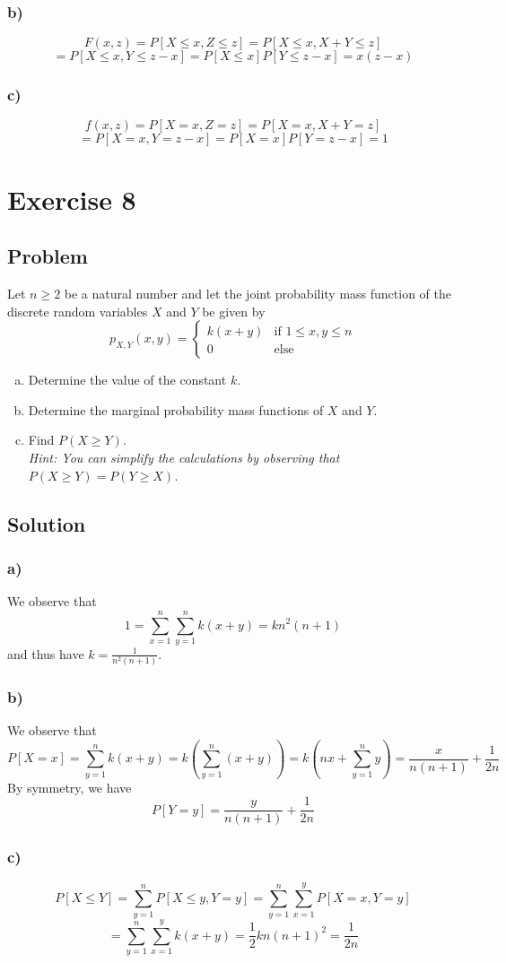 \documentclass[a4paper,10pt]{article}
\begin{document}
\subsubsection{b)}
$$
  F(x, z) = P[X \leq x, Z \leq z] = P[X \leq x, X + Y \leq z]
$$
$$
  = P[X \leq x, Y \leq z - x] = P[X \leq x]P[Y \leq z - x] = x (z - x)
$$

\subsubsection{c)}
$$
  f(x, z) = P[X = x, Z = z] = P[X = x, X + Y = z]
$$
$$
   = P[X = x, Y = z - x] = P[X = x]P[Y = z - x] = 1
$$

\section{Exercise 8}
\subsection{Problem}

Let $n \geq 2$ be a natural number and let the joint probability mass function of the discrete random variables $X$ and $Y$ be given by
$$
  p_{X,Y}(x, y) = \begin{cases}
    k (x + y) & \mbox{if }1 \leq x,y \leq n \\
    0 & \mbox{else}
  \end{cases}
$$

\begin{enumerate}[a)]
  \item Determine the value of the constant $k$.
  \item Determine the marginal probability mass functions of $X$ and $Y$.
  \item Find $P(X \geq Y)$. \\
  \textit{Hint: You can simplify the calculations by observing that $P(X \geq Y) = P(Y \geq X)$. }
\end{enumerate}

\subsection{Solution}
\subsubsection{a)}
We observe that $$
  1 = \sum_{x = 1}^{n}{\sum_{y = 1}^{n}{k (x + y)}} = k n^2 (n + 1)
$$ and thus have $k = \frac{1}{n^2 (n + 1)}$.
\subsubsection{b)}
We observe that $$
  P[X = x] = \sum_{y = 1}^{n}{k (x + y)} = k (\sum_{y = 1}^{n}{(x + y)})
  = k (nx + \sum_{y = 1}^{n}{y})
  = \frac{x}{n (n + 1)} + \frac{1}{2 n}
$$ By symmetry, we have
$$
  P[Y = y] = \frac{y}{n (n + 1)} + \frac{1}{2 n}
$$
\subsubsection{c)}
$$
  P[X \leq Y] = \sum_{y=1}^{n}{P[X \leq y, Y=y]} = \sum_{y=1}^{n}{\sum_{x=1}^{y}{P[X = x, Y = y]}}
$$
$$
  = \sum_{y=1}^{n}{\sum_{x=1}^{y}{k (x + y)}} = \frac{1}{2} k n (n + 1)^2 = \frac{1}{2n}
$$
\end{document}
